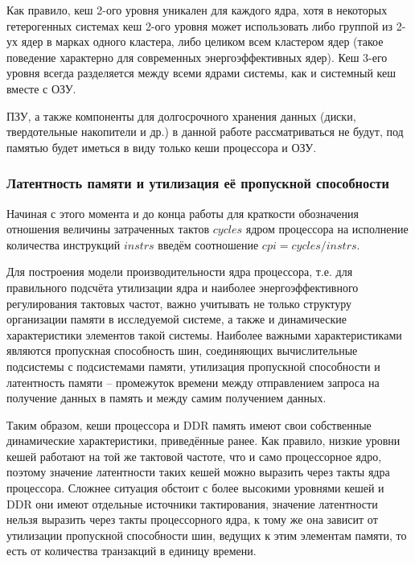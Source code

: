     Как правило, кеш 2-ого уровня уникален для каждого ядра, хотя в некоторых гетерогенных системах
    кеш 2-ого уровня может использовать либо группой из 2-ух ядер в марках одного кластера, либо
    целиком всем кластером ядер (такое поведение характерно для современных энергоэффективных ядер).
    Кеш 3-его уровня всегда разделяется между всеми ядрами системы, как и системный кеш вместе с ОЗУ.

    ПЗУ, а также компоненты для долгосрочного хранения данных (диски, твердотельные накопители и др.)
    в данной работе рассматриваться не будут, под памятью будет иметься в виду только кеши процессора
    и ОЗУ.

\subsubsection{Латентность памяти и утилизация её пропускной способности} \label{lat_util_chapter}

    Начиная с этого момента и до конца работы для краткости обозначения отношения величины
    затраченных тактов $cycles$ ядром процессора на исполнение количества инструкций $instrs$
    введём соотношение $cpi = cycles / instrs$.

    Для построения модели производительности ядра процессора, т.е. для правильного подсчёта утилизации
    ядра и наиболее энергоэффективного регулирования тактовых частот, важно учитывать не только
    структуру организации памяти в исследуемой системе, а также и динамические характеристики
    элементов такой системы. Наиболее важными характеристиками являются пропускная способность шин,
    соединяющих вычислительные подсистемы с подсистемами памяти, утилизация пропускной способности и
    латентность памяти -- промежуток времени между отправлением запроса на получение данных в память и
    между самим получением данных.

    Таким образом, кеши процессора и DDR память имеют свои собственные динамические характеристики,
    приведённые ранее. Как правило, низкие уровни кешей работают на той же тактовой частоте, что
    и само процессорное ядро, поэтому значение латентности таких кешей можно выразить через такты ядра
    процессора. Сложнее ситуация обстоит с более высокими уровнями кешей и DDR они имеют отдельные
    источники тактирования, значение латентности нельзя выразить через такты процессорного ядра,
    к тому же она зависит от утилизации пропускной способности шин, ведущих к этим элементам памяти,
    то есть от количества транзакций в единицу времени.

